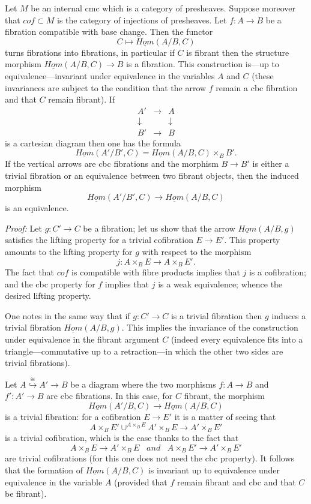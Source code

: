 \begin{proposition}
\label{hominternerelatif}
Let $M$ be an internal cmc which is a category of presheaves.
Suppose
moreover that $cof \subset M$ is the category of injections of
presheaves. Let
$f:A\rightarrow B$ be a fibration compatible with base change. Then the
functor
$$
C\mapsto \underline{Hom}(A/B, C)
$$
turns fibrations into
fibrations, in particular if $C$ is fibrant then the structure morphism
$\underline{Hom}(A/B, C)\rightarrow B$ is a fibration. This construction
is---up to equivalence---invariant under equivalence in the
variables $A$ and $C$ (these invariances are subject to the condition that the
arrow $f$ remain a cbc fibration and that $C$ remain fibrant).
If
$$
\begin{array}{ccc}
A' &\rightarrow & A \\
\downarrow && \downarrow \\
B'&\rightarrow &B
\end{array}
$$
is a cartesian diagram
then one has the formula
$$
\underline{Hom}(A'/B', C) = \underline{Hom}(A/B,C)\times _BB'.
$$
If the vertical arrows are cbc fibrations and the morphism
$B\rightarrow
B'$ is either a trivial fibration or an equivalence between two
fibrant objects, then the induced morphism
$$
\underline{Hom}(A'/B', C) \rightarrow  \underline{Hom}(A/B,C)
$$
is an equivalence.
\end{proposition}
{\em Proof:} Let $g:C'\rightarrow C$ be a fibration; let us show that
the arrow
$\underline{Hom}(A/B,g)$ satisfies the lifting property for a
trivial cofibration $E\rightarrow E'$. This property amounts to the
lifting property for $g$ with respect to the morphism
$$
j:A\times _BE\rightarrow A\times _BE' .
$$
The fact that $cof$ is compatible with fibre products implies that $j$
is a cofibration; and the cbc property for $f$ implies that $j$
is a
weak equivalence; whence the desired lifting property.

One notes in the same way that if $g:C'\rightarrow C$ is a trivial
fibration then $g$ induces a trivial fibration $\underline{Hom}(A/B,g)$.
This
implies the invariance of the construction under
equivalence in the fibrant argument
$C$ (indeed every equivalence fits into a
triangle---commutative up to a retraction---in which the other two
sides
are trivial fibrations).

Let $A\stackrel{\cong}{\hookrightarrow}A'\rightarrow B$ be a diagram
where the
two morphisms $f:A\rightarrow B$ and $f':A'\rightarrow B$ are
cbc fibrations. In this case, for $C$ fibrant, the morphism
$$
\underline{Hom}(A'/B,C)\rightarrow \underline{Hom}(A/B, C)
$$
is a trivial fibration: for a cofibration $E\rightarrow E'$ it
is a matter of seeing that
$$
A\times _B E'
\cup ^{A\times _BE} A'\times _B E \rightarrow A'\times _BE'
$$
is a trivial cofibration, which is the case thanks to the fact that
$$
A\times _BE\rightarrow A'\times _BE \;\;\; and \;\;\;
A\times _BE' \rightarrow A'\times _BE'
$$
are trivial cofibrations (for this one does not need the
cbc property). It follows that the formation of $\underline{Hom}(A/B, C)$ is
invariant
up to
equivalence under equivalence in the variable $A$ (provided that
$f$ remain fibrant and cbc and that $C$ be fibrant).

